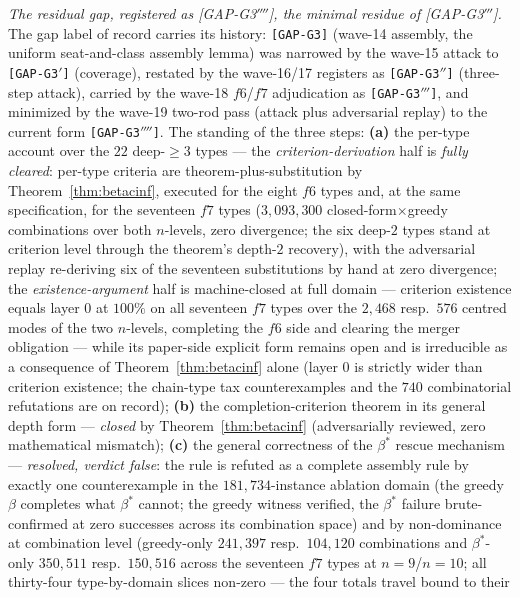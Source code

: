 \emph{The residual gap, registered as \textup{[GAP-G3$''''$]}, the minimal residue of
\textup{[GAP-G3$'''$]}.} The gap label of record carries its history: \texttt{[GAP-G3]}
(wave-14 assembly, the uniform seat-and-class assembly lemma) was narrowed by the wave-15
attack to \texttt{[GAP-G3$'$]} (coverage), restated by the wave-16/17 registers as
\texttt{[GAP-G3$''$]} (three-step attack), carried by the wave-18 $f6$/$f7$ adjudication
as \texttt{[GAP-G3$'''$]}, and minimized by the wave-19 two-rod pass (attack plus
adversarial replay) to the current form \texttt{[GAP-G3$''''$]}. The standing of the
three steps: \textbf{(a)} the per-type account over the $22$ deep-$\ge3$ types ---
the \emph{criterion-derivation} half is \emph{fully cleared}: per-type criteria are
theorem-plus-substitution by Theorem~\ref{thm:betacinf}, executed for the eight $f6$
types and, at the same specification, for the seventeen $f7$ types ($3{,}093{,}300$
closed-form$\times$greedy combinations over both $n$-levels, zero divergence; the six
deep-$2$ types stand at criterion level through the theorem's depth-$2$ recovery), with
the adversarial replay re-deriving six of the seventeen substitutions by hand at zero
divergence; the \emph{existence-argument} half is machine-closed at full domain ---
criterion existence equals layer $0$ at $100\%$ on all seventeen $f7$ types over the
$2{,}468$ resp.\ $576$ centred modes of the two $n$-levels, completing the $f6$ side and
clearing the merger obligation --- while its paper-side explicit form remains open and
is irreducible as a consequence of Theorem~\ref{thm:betacinf} alone (layer $0$ is
strictly wider than criterion existence; the chain-type tax counterexamples and the
$740$ combinatorial refutations are on record); \textbf{(b)} the completion-criterion
theorem in its general depth form --- \emph{closed} by Theorem~\ref{thm:betacinf}
(adversarially reviewed, zero mathematical mismatch); \textbf{(c)} the general
correctness of the $\beta^\ast$ rescue mechanism --- \emph{resolved, verdict false}: the
rule is refuted as a complete assembly rule by exactly one counterexample in the
$181{,}734$-instance ablation domain (the greedy $\beta$ completes what $\beta^\ast$
cannot; the greedy witness verified, the $\beta^\ast$ failure brute-confirmed at zero
successes across its combination space) and by non-dominance at combination level
(greedy-only $241{,}397$ resp.\ $104{,}120$ combinations and $\beta^\ast$-only
$350{,}511$ resp.\ $150{,}516$ across the seventeen $f7$ types at $n=9$/$n=10$; all
thirty-four type-by-domain slices non-zero --- the four totals travel bound to their
